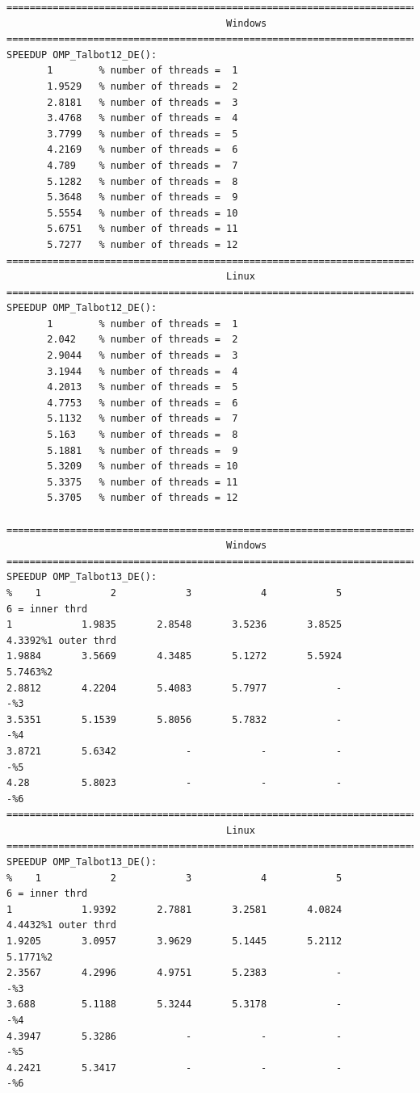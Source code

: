 \documentclass[a4paper,10pt]{report}%
\begin{document}
\begin{lstlisting}
====================================================================================
                                      Windows
====================================================================================
SPEEDUP OMP_Talbot12_DE():
       1        % number of threads =  1
       1.9529   % number of threads =  2
       2.8181   % number of threads =  3
       3.4768   % number of threads =  4
       3.7799   % number of threads =  5
       4.2169   % number of threads =  6
       4.789    % number of threads =  7
       5.1282   % number of threads =  8
       5.3648   % number of threads =  9
       5.5554   % number of threads = 10
       5.6751   % number of threads = 11
       5.7277   % number of threads = 12
====================================================================================
                                      Linux
====================================================================================
SPEEDUP OMP_Talbot12_DE():
       1        % number of threads =  1
       2.042    % number of threads =  2
       2.9044   % number of threads =  3
       3.1944   % number of threads =  4
       4.2013   % number of threads =  5
       4.7753   % number of threads =  6
       5.1132   % number of threads =  7
       5.163    % number of threads =  8
       5.1881   % number of threads =  9
       5.3209   % number of threads = 10
       5.3375   % number of threads = 11
       5.3705   % number of threads = 12

====================================================================================
                                      Windows
====================================================================================
SPEEDUP OMP_Talbot13_DE():
%    1            2            3            4            5            6 = inner thrd
1            1.9835       2.8548       3.5236       3.8525       4.3392%1 outer thrd
1.9884       3.5669       4.3485       5.1272       5.5924       5.7463%2
2.8812       4.2204       5.4083       5.7977            -            -%3
3.5351       5.1539       5.8056       5.7832            -            -%4
3.8721       5.6342            -            -            -            -%5
4.28         5.8023            -            -            -            -%6
====================================================================================
                                      Linux
====================================================================================
SPEEDUP OMP_Talbot13_DE():
%    1            2            3            4            5            6 = inner thrd
1            1.9392       2.7881       3.2581       4.0824       4.4432%1 outer thrd
1.9205       3.0957       3.9629       5.1445       5.2112       5.1771%2
2.3567       4.2996       4.9751       5.2383            -            -%3
3.688        5.1188       5.3244       5.3178            -            -%4
4.3947       5.3286            -            -            -            -%5
4.2421       5.3417            -            -            -            -%6
\end{lstlisting}
\end{document}
